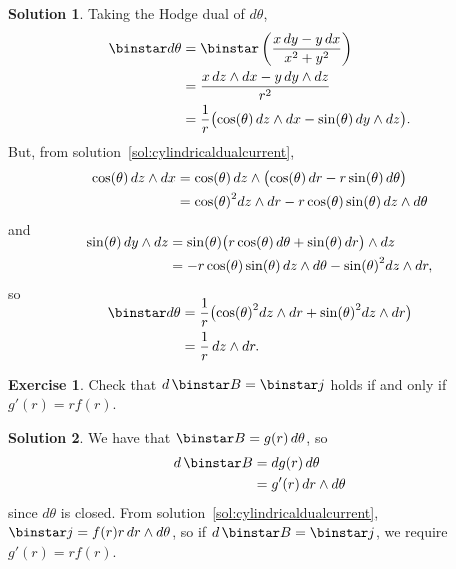 \documentclass[11pt, a4paper]{report}
\theoremstyle{definition}
\newtheorem{exercise}{Exercise}[part]
\newtheorem{solution}{Solution}[part]
\newenvironment{ex}{\begin{exercise}}{\end{exercise}\pagebreak[1]}
\newenvironment{sol}{\begin{solution}}{\end{solution}\pagebreak[3]}
\newcommand*{\op}[1]{\ensuremath\mathop{}\mathopen{}#1}
\renewcommand*{\d}{\op{d}}
\renewcommand*{\star}{\op{\binstar}\mathord{}}
\begin{document}
\begin{sol}

Taking the Hodge dual of $d\theta$,
\begin{align*}
    \star d\theta &= \star \left( \frac{x \d y - y \d x}{x^2 + y^2} \right) \\
                  &= \frac{x \d z \wedge dx - y \d y \wedge dz}{r^2} \\
                  &= \frac{1}{r} \bigl( \cos(\theta) \d z \wedge dx - \sin(\theta) \d y \wedge dz \bigr).
\end{align*}
But, from solution~\ref{sol:cylindricaldualcurrent},
\begin{align*}
    \cos(\theta) \d z \wedge dx &= \cos(\theta) \d z \wedge \bigl( \cos(\theta) \d r -r \sin(\theta) \d \theta \bigr) \\
        &= {\cos(\theta)}^2 dz \wedge dr - r \cos(\theta) \sin(\theta) \d z \wedge d\theta
\end{align*}
and
\begin{align*}
    \SwapAboveDisplaySkip
    \sin(\theta) \d y \wedge dz &= \sin(\theta) \bigl( r \cos(\theta) \d \theta + \sin(\theta) \d r \bigr) \wedge dz \\
        &= - r \cos(\theta) \sin(\theta) \d z \wedge d\theta - {\sin(\theta)}^2 dz \wedge dr,
\end{align*}
so
\begin{align*}
    \SwapAboveDisplaySkip
    \star d\theta &= \frac{1}{r} \bigl( {\cos(\theta)}^2 dz \wedge dr + {\sin(\theta)}^2 dz \wedge dr \bigr) \\
                  &= \frac{1}{r} \d z \wedge dr.
\end{align*}

\end{sol}

\begin{ex}

Check that $d \star B = \star j$ holds if and only if $g'(r) = r f(r)$.

\end{ex}

\begin{sol}

We have that $\star B = g(r) \d \theta$, so
\begin{align*}
    d \star B &= dg(r) \d \theta \\
              &= g'(r) \d r \wedge d\theta
\end{align*}
since $d\theta$ is closed.
From solution~\ref{sol:cylindricaldualcurrent}, $\star j = f(r) r \d r \wedge d\theta$, so if $d \star B = \star j$, we require $g'(r) = rf(r)$.

\end{sol}
\end{document}
